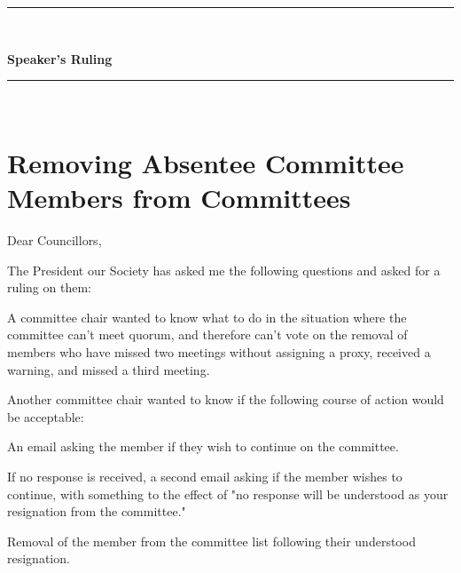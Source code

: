 
\begin{center}
\rule{\textwidth}{3.6pt}\\[\baselineskip] %
\begin{Huge}
\textbf{Speaker's Ruling}
\end{Huge}

\rule{\textwidth}{3.6pt}\\[\baselineskip] %



\vspace*{2\baselineskip} %
\end{center}
\section*{Removing Absentee Committee Members from Committees}

Dear Councillors,

The President our Society has asked me the following questions and asked for a ruling on them: 
\begin{longenum}[ label*=\arabic*., align=left]

\item A committee chair wanted to know what to do in the situation where the committee can't meet quorum, and therefore can't vote on the removal of members who have missed two meetings without assigning a proxy, received a warning, and missed a third meeting. 

\item Another committee chair wanted to know if the following course of action would be acceptable:
\begin{longenum}[ label*=\arabic*., align=left]
\item An email asking the member if they wish to continue on the committee.
\item If no response is received, a second email asking if the member wishes to continue, with something to the effect of "no response will be understood as your resignation from the committee."
\item Removal of the member from the committee list following their understood resignation.
\end{longenum}



\end{longenum}	

